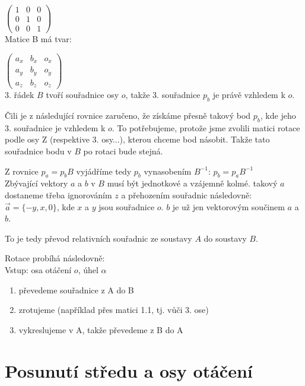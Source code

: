 \documentclass[a4paper,12pt]{book}
\begin{document}
$\begin{pmatrix}
1 & 0 & 0\\
0 & 1 & 0\\
0 & 0 & 1
\end{pmatrix}$\\

Matice B má tvar:

$\begin{pmatrix}
a_x& b_x& o_x\\
a_y & b_y& o_y\\
a_z & b_z & o_z
\end{pmatrix}$\\

3. řádek $B$ tvoří souřadnice osy $o$, takže 3. souřadnice $p_b$ je právě vzhledem k $o$.

Čili je z následující rovnice zaručeno, že získáme přesně takový bod $p_b$, kde jeho 3. souřadnice je vzhledem k $o$. To potřebujeme, protože jsme zvolili matici
rotace podle osy Z (respektive 3. osy...), kterou chceme bod násobit. Takže tato souřadnice bodu v $B$ po rotaci bude stejná.

Z rovnice $p_a = p_b B$ vyjádříme tedy $p_b$ vynasobením $B^{-1}$: $p_b = p_a B^{-1}$\\ %


Zbývající vektory $a$ a $b$ v $B$ musí být jednotkové a vzájemně kolmé. takový $a$ dostaneme třeba ignorováním $z$ a přehozením souřadnic následovně: $\vec{a} = \{-y, x, 0\}$, kde $x$ a $y$ jsou souřadnice $o$. $b$ je už jen vektorovým součinem $a$ a $b$.

To je tedy převod relativních souřadnic ze soustavy $A$ do soustavy $B$.




Rotace probíhá následovně:\\

Vstup: osa otáčení $o$, úhel $\alpha$

\begin{enumerate}[label=\arabic*, font=\bfseries] %
	\item převedeme souřadnice z A do B
	\item zrotujeme (například přes matici 1.1, tj. vůči 3. ose)
	\item vykreslujeme v A, takže převedeme z B do A
\end{enumerate}

\section{Posunutí středu a osy otáčení}
\end{document}

